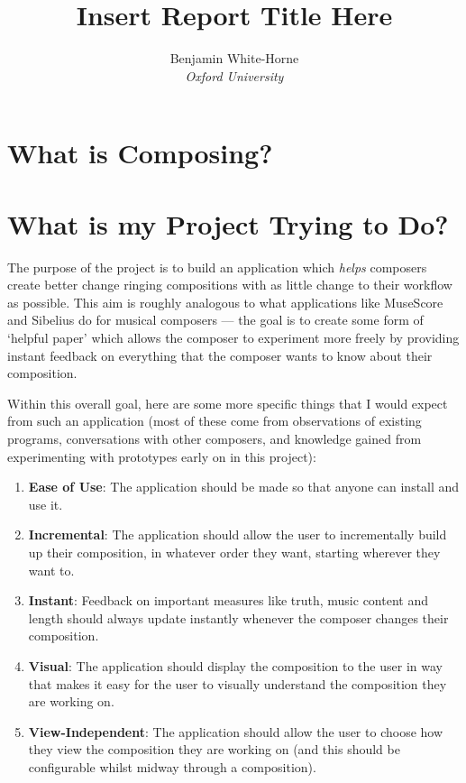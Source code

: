 \documentclass[12pt]{article}
\title{Insert Report Title Here}
\author{Benjamin White-Horne \\ \emph{Oxford University}}
\begin{document}
\maketitle
\pagebreak
\tableofcontents
\pagebreak

\section{What is Composing?}

\section{What is my Project Trying to Do?}

The purpose of the project is to build an application which \emph{helps} composers create better
change ringing compositions with as little change to their workflow as possible.  This aim is
roughly analogous to what applications like MuseScore and Sibelius do for musical composers --- the
goal is to create some form of `helpful paper' which allows the composer to experiment more freely
by providing instant feedback on everything that the composer wants to know about their composition.

Within this overall goal, here are some more specific things that I would expect from such an
application (most of these come from observations of existing programs, conversations with other
composers, and knowledge gained from experimenting with prototypes early on in this project):

\begin{enumerate}
    \item \textbf{Ease of Use}: The application should be made so that anyone can install and use
        it.
    \item \textbf{Incremental}: The application should allow the user to incrementally build up
        their composition, in whatever order they want, starting wherever they want to.
    \item \textbf{Instant}: Feedback on important measures like truth, music content and length
        should always update instantly whenever the composer changes their composition.
    \item \textbf{Visual}: The application should display the composition to the user in way that
        makes it easy for the user to visually understand the composition they are working on.
    \item \textbf{View-Independent}: The application should allow the user to choose how they view
        the composition they are working on (and this should be configurable whilst midway through a
        composition).
\end{enumerate}
\end{document}
